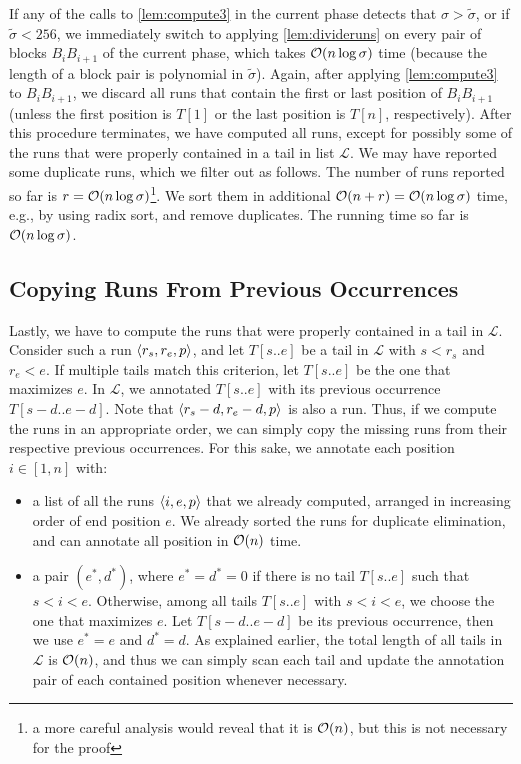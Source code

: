 If any of the calls to \cref{lem:compute3} in the current phase detects that $\sigma>\tilde{\sigma}$, or if $\tilde{\sigma} < 256$, we immediately switch to
applying \cref{lem:divideruns} on every pair of blocks $B_{i}B_{i+1}$ of the current phase, which takes $\mathcal{O}(n \log \sigma)$ time (because the length of a block pair is polynomial in $\tilde{\sigma}$). Again, after applying \cref{lem:compute3} to $B_{i}B_{i+1}$, we discard all runs that contain the first or last position of $B_{i}B_{i+1}$ (unless the first position is $T[1]$ or the last position is $T[n]$, respectively).
After this procedure terminates, we have computed all runs, except for possibly some of the runs that were properly contained in a tail in list $\mathcal L$.
We may have reported some duplicate runs, which we filter out as follows.
The number of runs reported so far is $r=\mathcal{O}(n\log\sigma)$\footnote{a more careful analysis would reveal that it is $\mathcal{O}(n)$, but this is not necessary for the proof}.
We sort them in additional $\mathcal{O}(n+r)=\mathcal{O}(n\log\sigma)$ time, e.g., by using radix sort, and remove duplicates.
The running time so far is $\mathcal{O}(n\log \sigma)$.

\subsection{Copying Runs From Previous Occurrences}
\label{sec:copyruns}

Lastly, we have to compute the runs that were properly contained in a tail in $\mathcal L$. 
Consider such a run $\left\langle r_s, r_e, p\right\rangle$, and let $T[s..e]$ be a tail in $\mathcal L$ with $s < r_s$ and $r_e < e$. If multiple tails match this criterion, let $T[s..e]$ be the one that maximizes $e$.
In $\mathcal L$, we annotated $T[s..e]$ with its previous occurrence $T[s-d..e-d]$.
Note that $\left\langle r_s - d, r_e - d, p\right\rangle$ is also a run.
Thus, if we compute the runs in an appropriate order, we can simply copy the missing runs from their respective previous occurrences. For this sake, we annotate each position $i \in [1, n]$ with:

\begin{itemize}
\item a list of all the runs $\left\langle i, e, p\right\rangle$ that we already computed, arranged in increasing order of end position $e$. We already sorted the runs for duplicate elimination, and can annotate all position in $\mathcal{O}(n)$ time.
\item a pair $(e^*, d^*)$, where $e^* = d^* = 0$ if there is no tail $T[s..e]$ such that $s < i < e$. Otherwise, among all tails $T[s..e]$ with $s < i < e$, we choose the one that maximizes $e$. Let $T[s-d..e-d]$ be its previous occurrence, then we use $e^* = e$ and $d^* = d$. As explained earlier, the total length of all tails in $\mathcal L$ is $\mathcal{O}(n)$, and thus we can simply scan each tail and update the annotation pair of each contained position whenever necessary.
\end{itemize}

